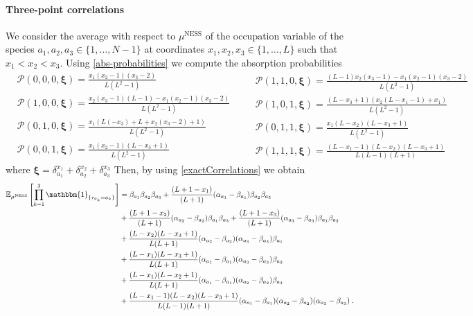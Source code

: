 \documentclass[10pt]{article}
\numberwithin{equation}{section}
\numberwithin{equation}{subsection}
\newcommand{\dt}{\;.}
\begin{document}
\paragraph{Three-point correlations}
We consider the average with respect to $\mu^{\text{NESS}}$ of the occupation variable of the species  $a_{1},a_{2},a_{3}\in \{1,\ldots,N-1\}$ at coordinates $x_{1},x_{2},x_{3}\in \{1,\ldots,L\}$ such that $x_{1}<x_{2}<x_{3}$. Using \eqref{abs-probabilities} we compute the absorption probabilities 
\begin{equation}
	\begin{split}
	&\mathcal{P}(0,0,0,\bm{\xi})=\frac{x_{1}(x_{2}-1)(x_{3}-2)}{L(L^{2}-1)}\\
	&\mathcal{P}(1,0,0,\bm{\xi})=\frac{ x_{2} (x_3-1)(L-1)-x_1 (x_2-1)
		(x_3-2)}{L \left(L^2-1\right)}\\
	&\mathcal{P}(0,1,0,\bm{\xi})=\frac{x_1 (L (-x_3)+L+x_2 (x_3-2)+1)}{L(L^2-1)}\\
	&\mathcal{P}(0,0,1,\bm{\xi})=\frac{x_1 (x_2-1) (L-x_3+1)}{L \left(L^2-1\right)}
	\end{split}\quad \begin{split}
	&\mathcal{P}(1,1,0,\bm{\xi})=\frac{(L-1) x_2 (x_3-1)-x_1 (x_2-1)
		(x_3-2)}{L \left(L^2-1\right)}\\
	&\mathcal{P}(1,0,1,\bm{\xi})=\frac{(L-x_3+1) (x_2 (L-x_1-1)+x_1)}{L
		\left(L^2-1\right)}\\
	&\mathcal{P}(0,1,1,\bm{\xi})=\frac{x_1 (L-x_2) (L-x_3+1)}{L \left(L^2-1\right)}\\
	&\mathcal{P}(1,1,1,\bm{\xi})=\frac{(L-x_{1}-1)(L-x_{2})(L-x_{3}+1)}{L(L-1)(L+1)}
\end{split}
\end{equation}
where $\bm{\xi}=\delta_{a_{1}}^{x_{1}}+\delta_{a_{2}}^{x_{2}}+\delta_{a_{3}}^{x_{3}}$ Then, by using \eqref{exactCorrelations} we obtain 
\begin{align}\label{three-pts-corr}
 \mathbb{E}_{\mu^{\text{NESS}}}\left[\prod_{k=1}^{3}\mathbbm{1}_{\{\tau_{x_{k}}=a_{k}\}}\right]&=\beta_{a_{1}}\beta_{a_{2}}\beta_{a_{3}}+\frac{(L+1-x_{1})}{(L+1)}(\alpha_{a_{1}}-\beta_{a_{1}})\beta_{a_{2}}\beta_{a_{3}}
	\\&+\nonumber
	\frac{(L+1-x_{2})}{(L+1)}(\alpha_{a_{2}}-\beta_{a_{2}})\beta_{a_{1}}\beta_{a_{3}}+\frac{(L+1-x_{3})}{(L+1)}(\alpha_{a_{3}}-\beta_{a_{3}})\beta_{a_{1}}\beta_{a_{2}}
	\\&+\nonumber
	\frac{(L-x_{2})(L-x_{3}+1)}{L(L+1)}(\alpha_{a_{2}}-\beta_{a_{2}})(\alpha_{a_{3}}-\beta_{a_{3}})\beta_{a_{1}}
	\\&+\nonumber
	\frac{(L-x_{1})(L-x_{3}+1)}{L(L+1)}(\alpha_{a_{1}}-\beta_{a_{1}})(\alpha_{a_{3}}-\beta_{a_{3}})\beta_{a_{2}}
	\\&+\nonumber
	\frac{(L-x_{1})(L-x_{2}+1)}{L(L+1)}(\alpha_{a_{1}}-\beta_{a_{1}})(\alpha_{a_{2}}-\beta_{a_{2}})\beta_{a_{3}}
	\\&+\nonumber
	\frac{(L-x_{1}-1)(L-x_{2})(L-x_{3}+1)}{L(L-1)(L+1)}(\alpha_{a_{1}}-\beta_{a_{1}})(\alpha_{a_{2}}-\beta_{a_{2}})(\alpha_{a_{3}}-\beta_{a_{3}})\dt
\end{align}
\end{document}
